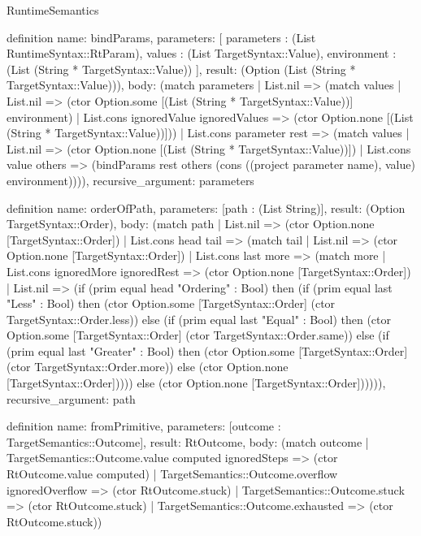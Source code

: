 \begin{lexlean}{RuntimeSemantics}
\begin{semanticmodule}
definition{
  name: bindParams,
  parameters: [
    parameters : (List RuntimeSyntax::RtParam),
    values : (List TargetSyntax::Value),
    environment : (List (String * TargetSyntax::Value))
  ],
  result: (Option (List (String * TargetSyntax::Value))),
  body: (match parameters
    | List.nil => (match values
      | List.nil => (ctor Option.some [(List (String * TargetSyntax::Value))] environment)
      | List.cons ignoredValue ignoredValues => (ctor Option.none [(List (String * TargetSyntax::Value))]))
    | List.cons parameter rest => (match values
      | List.nil => (ctor Option.none [(List (String * TargetSyntax::Value))])
      | List.cons value others => (bindParams rest others (cons ((project parameter name), value) environment)))),
  recursive_argument: parameters
}

definition{
  name: orderOfPath,
  parameters: [path : (List String)],
  result: (Option TargetSyntax::Order),
  body: (match path
    | List.nil => (ctor Option.none [TargetSyntax::Order])
    | List.cons head tail => (match tail
      | List.nil => (ctor Option.none [TargetSyntax::Order])
      | List.cons last more => (match more
        | List.cons ignoredMore ignoredRest => (ctor Option.none [TargetSyntax::Order])
        | List.nil => (if (prim equal head "Ordering" : Bool) then (if (prim equal last "Less" : Bool) then (ctor Option.some [TargetSyntax::Order] (ctor TargetSyntax::Order.less)) else (if (prim equal last "Equal" : Bool) then (ctor Option.some [TargetSyntax::Order] (ctor TargetSyntax::Order.same)) else (if (prim equal last "Greater" : Bool) then (ctor Option.some [TargetSyntax::Order] (ctor TargetSyntax::Order.more)) else (ctor Option.none [TargetSyntax::Order])))) else (ctor Option.none [TargetSyntax::Order]))))),
  recursive_argument: path
}

definition{
  name: fromPrimitive,
  parameters: [outcome : TargetSemantics::Outcome],
  result: RtOutcome,
  body: (match outcome
    | TargetSemantics::Outcome.value computed ignoredSteps => (ctor RtOutcome.value computed)
    | TargetSemantics::Outcome.overflow ignoredOverflow => (ctor RtOutcome.stuck)
    | TargetSemantics::Outcome.stuck => (ctor RtOutcome.stuck)
    | TargetSemantics::Outcome.exhausted => (ctor RtOutcome.stuck))
}


\end{semanticmodule}
\end{lexlean}
